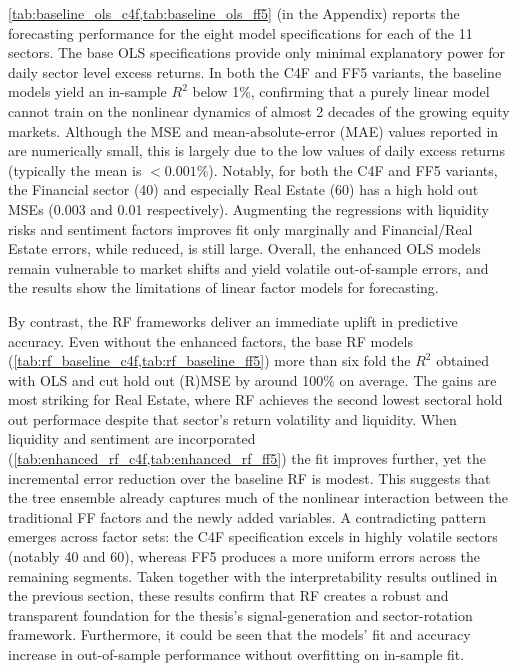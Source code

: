 \cref{tab:baseline_ols_c4f,tab:baseline_ols_ff5} (in the Appendix) reports the forecasting performance for the eight model specifications for each of the 11 sectors. The base OLS specifications provide only minimal explanatory power for daily sector level excess returns. In both the C4F and FF5 variants, the baseline models yield an in-sample $R^{2}$ below 1\%, confirming that a purely linear model cannot train on the nonlinear dynamics of almost 2 decades of the growing equity markets. Although the MSE and mean-absolute-error (MAE) values reported in  are numerically small, this is largely due to the low values of daily excess returns (typically the mean is  $<0.001\%$). Notably, for both the C4F and FF5 variants, the Financial sector (40) and especially Real Estate (60) has a high hold out MSEs (0.003 and 0.01 respectively). Augmenting the regressions with liquidity risks and sentiment factors  improves fit only marginally and Financial/Real Estate errors, while reduced, is still large. Overall, the enhanced OLS models remain vulnerable to market shifts and yield volatile out-of-sample errors, and the results show the limitations of linear factor models for forecasting.

By contrast, the RF frameworks deliver an immediate uplift in predictive accuracy. Even without the enhanced factors, the base RF models (\cref{tab:rf_baseline_c4f,tab:rf_baseline_ff5}) more than six fold the $R^{2}$ obtained with OLS and cut hold out (R)MSE by around 100\% on average. The gains are most striking for Real Estate, where RF achieves the second lowest sectoral hold out performace despite that sector's return volatility and liquidity. When liquidity and sentiment are incorporated (\cref{tab:enhanced_rf_c4f,tab:enhanced_rf_ff5}) the fit improves further, yet the incremental error reduction over the baseline RF is modest. This suggests that the tree ensemble already captures much of the nonlinear interaction between the traditional FF factors and the newly added variables. A contradicting pattern emerges across factor sets: the C4F specification excels in highly volatile sectors (notably 40 and 60), whereas FF5 produces a more uniform errors across the remaining segments. Taken together with the interpretability results outlined in the previous section, these results confirm that RF creates a robust and transparent foundation for the thesis's signal-generation and sector-rotation framework. Furthermore, it could be seen that the models' fit and accuracy increase in out-of-sample performance without overfitting on in-sample fit.

